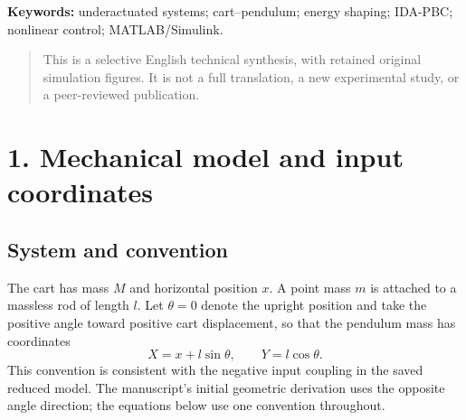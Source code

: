 \documentclass[11pt,a4paper]{article}
\newcommand{\reportsection}[1]{\section*{\color{navy}#1}}
\newcommand{\topic}[1]{\subsection*{\color{teal}#1}}
\newcommand{\note}[1]{\begin{quote}\small\color{muted}#1\end{quote}}
\begin{document}
\vspace{2mm}
\textbf{Keywords:} underactuated systems; cart--pendulum; energy shaping; IDA-PBC; nonlinear control; MATLAB/Simulink.
\note{This is a selective English technical synthesis, with retained original simulation figures. It is not a full translation, a new experimental study, or a peer-reviewed publication.}

\clearpage
\reportsection{1. Mechanical model and input coordinates}
\topic{System and convention}
The cart has mass $M$ and horizontal position $x$. A point mass $m$ is attached to a massless rod of length $l$. Let $\theta=0$ denote the upright position and take the positive angle toward positive cart displacement, so that the pendulum mass has coordinates
\[
 X=x+l\sin\theta,\qquad Y=l\cos\theta.
\]
This convention is consistent with the negative input coupling in the saved reduced model. The manuscript's initial geometric derivation uses the opposite angle direction; the equations below use one convention throughout.

\begin{center}
\end{center}
\end{document}

